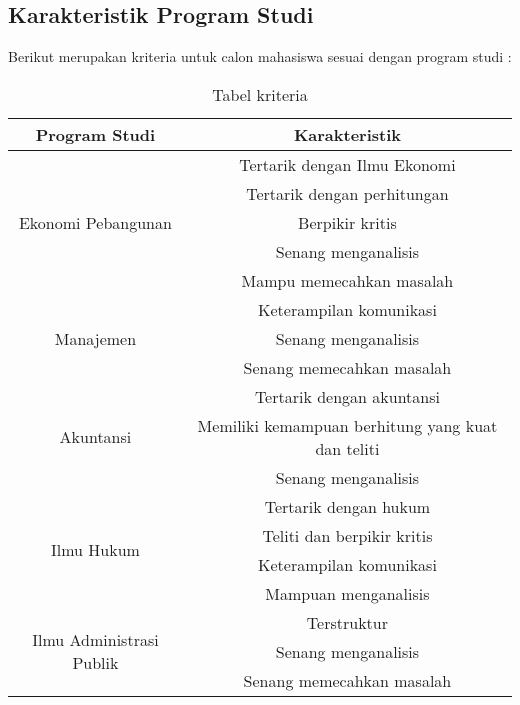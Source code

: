\subsection{Karakteristik Program Studi}
Berikut merupakan kriteria untuk calon mahasiswa sesuai dengan program studi :

\begin{table}[H] %
	\centering 
	\caption{Tabel kriteria}
	\label{tab:contoh1}
	\begin{tabular}{| c | c |}
		\hline
		Program Studi & Karakteristik \\

		\hline
		\multirow{5}{10em}{Ekonomi Pebangunan} & Tertarik dengan Ilmu Ekonomi \\
		& Tertarik dengan perhitungan \\
		& Berpikir kritis \\
		& Senang menganalisis\\
		& Mampu memecahkan masalah\\
		
		\hline
		\multirow{3}{10em}{Manajemen} & Keterampilan komunikasi \\
		& Senang menganalisis\\
		& Senang memecahkan masalah\\
		
		\hline
		\multirow{3}{10em}{Akuntansi} & Tertarik dengan akuntansi \\
		& Memiliki kemampuan berhitung yang kuat dan teliti \\
		& Senang menganalisis\\
		
		\hline
		
		\hline
		\multirow{4}{10em}{Ilmu Hukum} & Tertarik dengan hukum \\
		& Teliti dan berpikir kritis \\
		& Keterampilan komunikasi \\
		& Mampuan menganalisis\\
		
		\hline
		\multirow{3}{10em}{Ilmu Administrasi Publik} & Terstruktur \\
		& Senang menganalisis\\
		& Senang memecahkan masalah\\
		

\end{tabular}
\end{table}
